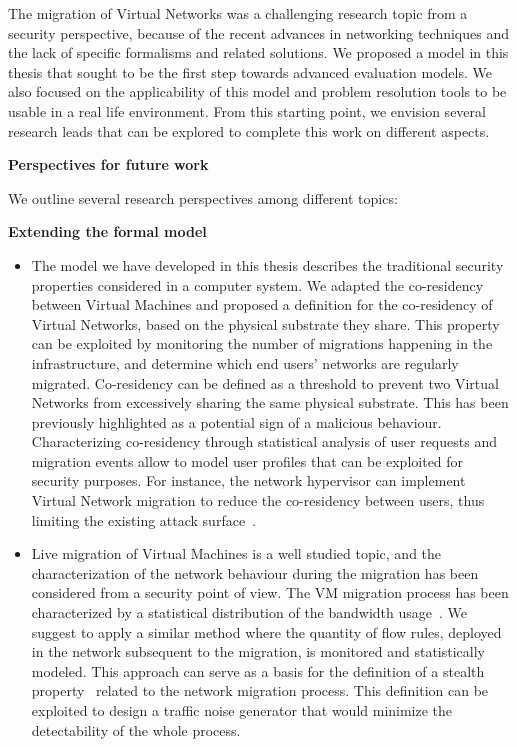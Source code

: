 The migration of Virtual Networks was a challenging research topic from a security perspective, because of the recent advances in networking techniques and the lack of specific formalisms and related solutions. We proposed a model in this thesis that sought to be the first step towards advanced evaluation models. We also focused on the applicability of this model and problem resolution tools to be usable in a real life environment. From this starting point, we envision several research leads that can be explored to complete this work on different aspects.

\textbf{Perspectives for future work}

We outline several research perspectives among different topics: 

\textbf{Extending the formal model}
\begin{itemize}
    \item 
    The model we have developed in this thesis describes the traditional security properties considered in a computer system. We adapted the co-residency between Virtual Machines and proposed a definition for the co-residency of Virtual Networks, based on the physical substrate they share. This property can be exploited by monitoring the number of migrations happening in the infrastructure, and determine which end users' networks are regularly migrated. Co-residency can be defined as a threshold to prevent two Virtual Networks from excessively sharing the same physical substrate. This has been previously highlighted as a potential sign of a malicious behaviour. Characterizing co-residency through statistical analysis of user requests and migration events allow to model user profiles that can be exploited for security purposes. For instance, the network hypervisor can implement Virtual Network migration to reduce the co-residency between users, thus limiting the existing attack surface~\cite{nomad-Moon2015b,malicious-atya2017}.

    \item 
    Live migration of Virtual Machines is a well studied topic, and the characterization of the network behaviour during the migration has been considered from a security point of view.
    The VM migration process has been characterized by a statistical distribution of the bandwidth usage~\cite{stealth-Achleitner2017a}.
    We suggest to apply a similar method where the quantity of flow rules, deployed in the network subsequent to the migration, is monitored and statistically modeled. This approach can serve as a basis for the definition of a stealth property~\cite{stealth-Achleitner2017a} related to the network migration process. This definition can be exploited to design a traffic noise generator that would minimize the detectability of the whole process.


\end{itemize}
